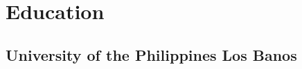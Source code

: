 \documentclass[]{deedy-resume-openfont}
\begin{document}
\begin{minipage}[t]{0.66\textwidth}

\section{Education} 

\subsection{University of the Philippines Los Banos}
\sectionsep



%
%


\end{minipage}
\end{document}
